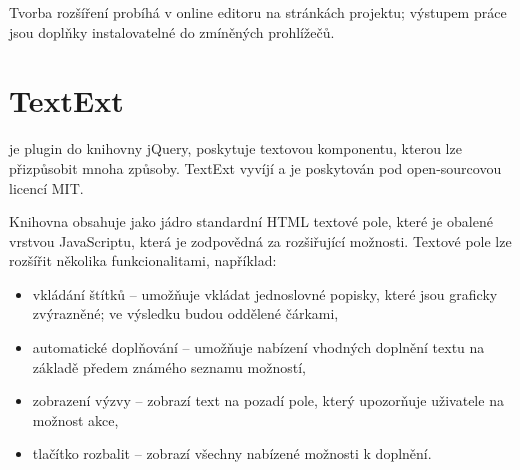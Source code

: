 Tvorba rozšíření probíhá v online editoru na stránkách projektu; výstupem práce jsou doplňky instalovatelné do zmíněných prohlížečů.

\section{TextExt}

 je plugin do knihovny jQuery, poskytuje textovou komponentu, kterou lze přizpůsobit mnoha způsoby.
TextExt vyvíjí  a je poskytován pod open-sourcovou licencí MIT.

Knihovna obsahuje jako jádro standardní HTML textové pole, které je obalené vrstvou JavaScriptu, která je zodpovědná za rozšiřující možnosti.
Textové pole lze rozšířit několika funkcionalitami, například:
\begin{itemize}
	\item vkládání štítků -- umožňuje vkládat jednoslovné popisky, které jsou graficky zvýrazněné; ve výsledku budou oddělené čárkami,
	\item automatické doplňování -- umožňuje nabízení vhodných doplnění textu na základě předem známého seznamu možností,
	\item zobrazení výzvy -- zobrazí text na pozadí pole, který upozorňuje uživatele na možnost akce,
	\item tlačítko rozbalit -- zobrazí všechny nabízené možnosti k doplnění.
\end{itemize}

